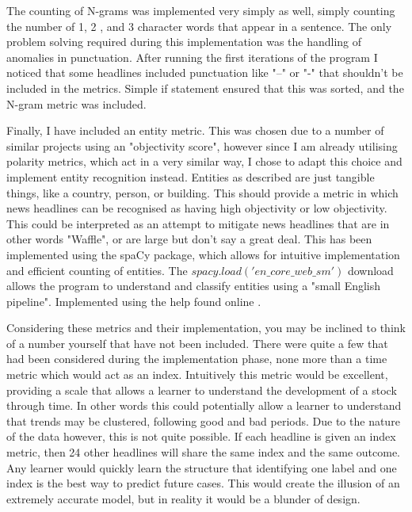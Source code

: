 \documentclass[11pt, a4paper]{article}
\begin{document}
The counting of N-grams was implemented very simply as well, simply counting the number of 1, 2 , and 3 character words that appear in a sentence. The only problem solving required during this implementation was the handling of anomalies in punctuation. After running the first iterations of the program I noticed that some headlines included punctuation like "--" or "-" that shouldn't be included in the metrics. Simple if statement ensured that this was sorted, and the N-gram metric was included.

Finally, I have included an entity metric. This was chosen due to a number of similar projects using an "objectivity score", however since I am already utilising polarity metrics, which act in a very similar way, I chose to adapt this choice and implement entity recognition instead. Entities as described are just tangible things, like a country, person, or building. This should provide a metric in which news headlines can be recognised as having high objectivity or low objectivity. This could be interpreted as an attempt to mitigate news headlines that are in other words "Waffle", or are large but don't say a great deal. This has been implemented using the spaCy package, which allows for intuitive implementation and efficient counting of entities. The $spacy.load('en\_core\_web\_sm')$ download allows the program to understand and classify entities using a "small English pipeline"\cite{Spacy}.
Implemented using the help found online \cite{Spacy2}.

Considering these metrics and their implementation, you may be inclined to think of a number yourself that have not been included. There were quite a few that had been considered during the implementation phase, none more than a time metric which would act as an index. Intuitively this metric would be excellent, providing a scale that allows a learner to understand the development of a stock through time. In other words this could potentially allow a learner to understand that trends may be clustered, following good and bad periods. Due to the nature of the data however, this is not quite possible. If each headline is given an index metric, then 24 other headlines will share the same index and the same outcome. Any learner would quickly learn the structure that identifying one label and one index is the best way to predict future cases. This would create the illusion of an extremely accurate model, but in reality it would be a blunder of design.


\newpage
\end{document}
